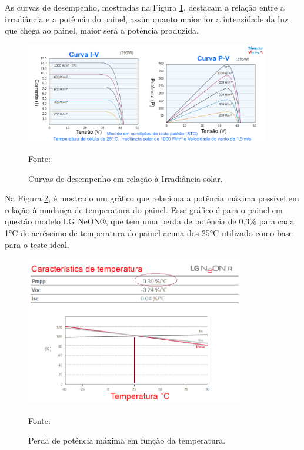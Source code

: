 As curvas de desempenho, mostradas na Figura \ref{fig:pv_luz}, destacam a relação entre a irradiância e a potência do painel, assim quanto maior for a intensidade da luz que chega ao painel, maior será a potência produzida.

\begin{figure}[H]
    \centering
    \includegraphics[width=0.95\textwidth]{./Figuras/pv_luz.png}
    \caption{Curvas de desempenho em relação à Irradiância solar.}{Fonte: \cite{cleanenergyreviews}}
   \label{fig:pv_luz}
\end{figure}

Na Figura \ref{fig:pv_temp}, é mostrado um gráfico que relaciona a potência máxima possível em relação à mudança de temperatura do painel. Esse gráfico é para o painel em questão modelo LG NeON®, que tem uma perda de potência de 0,3\% para cada 1°C de acréscimo de temperatura do painel acima dos 25°C utilizado como base para o teste ideal.

\begin{figure}[H]
    \centering
    \includegraphics[width=0.85\textwidth]{./Figuras/pv_temp.png}
    \caption{Perda de potência máxima em função da temperatura.}{Fonte: \cite{LG350Q1C}}
   \label{fig:pv_temp}
\end{figure}

